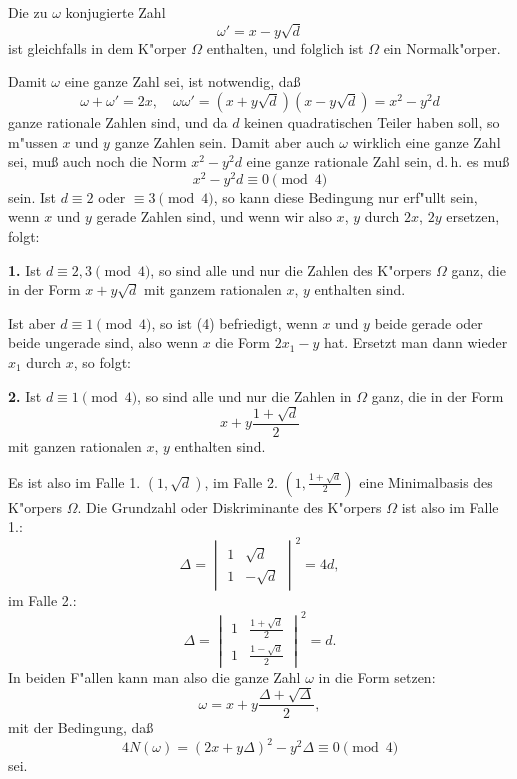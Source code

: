 \documentclass[12pt,a4paper]{article}
\theoremstyle{plain}
\begin{document}
Die zu $\omega$ konjugierte Zahl
\begin{equation}
\omega' = x - y\sqrt{d}
\tag{3}
\end{equation}
ist gleichfalls in dem K"orper $\Omega$ enthalten, und folglich ist $\Omega$ ein Normalk"orper.

Damit $\omega$ eine ganze Zahl sei, ist notwendig, da\ss{}
\[
\omega + \omega' = 2x,\quad \omega\omega' = (x + y\sqrt{d})(x - y\sqrt{d}) = x^2 - y^2 d
\]
ganze rationale Zahlen sind, und da $d$ keinen quadratischen Teiler haben soll, so m"ussen $x$ und $y$ ganze Zahlen sein. Damit aber auch $\omega$ wirklich eine ganze Zahl sei, mu\ss{} auch noch die Norm $x^2 - y^2 d$ eine ganze rationale Zahl sein, d.\,h. es mu\ss{}
\begin{equation}
x^2 - y^2 d \equiv 0 \pmod{4}
\tag{4}
\end{equation}
sein. Ist $d \equiv 2$ oder $\equiv 3 \pmod{4}$, so kann diese Bedingung nur erf"ullt sein, wenn $x$ und $y$ gerade Zahlen sind, und wenn wir also $x$, $y$ durch $2x$, $2y$ ersetzen, folgt:

\textbf{1.} Ist $d \equiv 2, 3 \pmod{4}$, so sind alle und nur die Zahlen des K"orpers $\Omega$ ganz, die in der Form $x + y\sqrt{d}$ mit ganzem rationalen $x$, $y$ enthalten sind.

Ist aber $d \equiv 1 \pmod{4}$, so ist (4) befriedigt, wenn $x$ und $y$ beide gerade oder beide ungerade sind, also wenn $x$ die Form $2x_1 - y$ hat. Ersetzt man dann wieder $x_1$ durch $x$, so folgt:

\textbf{2.} Ist $d \equiv 1 \pmod{4}$, so sind alle und nur die Zahlen in $\Omega$ ganz, die in der Form
\[
x + y\frac{1 + \sqrt{d}}{2}
\]
mit ganzen rationalen $x$, $y$ enthalten sind.

Es ist also im Falle 1. $(1, \sqrt{d})$, im Falle 2. $(1, \frac{1+\sqrt{d}}{2})$ eine Minimalbasis des K"orpers $\Omega$. Die Grundzahl oder Diskriminante des K"orpers $\Omega$ ist also im Falle 1.:
\begin{equation}
\Delta =
\begin{vmatrix}
1 & \sqrt{d} \\
1 & -\sqrt{d}
\end{vmatrix}^2
= 4d,
\tag{5}
\end{equation}
im Falle 2.:
\begin{equation}
\Delta =
\begin{vmatrix}
1 & \frac{1+\sqrt{d}}{2} \\
1 & \frac{1-\sqrt{d}}{2}
\end{vmatrix}^2
= d.
\tag{6}
\end{equation}
In beiden F"allen kann man also die ganze Zahl $\omega$ in die Form setzen:
\begin{equation}
\omega = x + y\frac{\Delta + \sqrt{\Delta}}{2},
\tag{7}
\end{equation}
mit der Bedingung, da\ss{}
\begin{equation}
4N(\omega) = (2x + y\Delta)^2 - y^2\Delta \equiv 0 \pmod{4}
\tag{8}
\end{equation}
sei.
\end{document}
